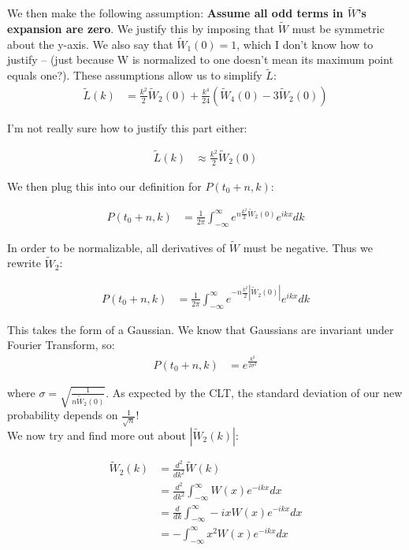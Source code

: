 \documentclass[10pt]{article} %
\begin{document}
We then make the following assumption: \textbf{Assume all odd terms in $\widetilde{W}$'s expansion are zero}. We justify this by imposing that
$\widetilde{W}$ must be symmetric about the y-axis. We also say that $\widetilde{W}_1(0)=1$, which I don't know how to justify -- (just because
W is normalized to one doesn't mean its maximum point equals one?). These assumptions allow us to simplify $\widetilde{L}$:\\

\begin{align*}
  \widetilde{L}(k) &= \frac{k^2}{2}\widetilde{W}_2(0) + \frac{k^4}{24}\left(\widetilde{W}_4(0) - 3\widetilde{W}_2(0)\right)
\end{align*}

I'm not really sure how to justify this part either:

\begin{align}
  \widetilde{L}(k) &\approx \frac{k^2}{2}\widetilde{W}_2(0)
\end{align}

We then plug this into our definition for $P(t_0+n,k)$:

\begin{align}
  P(t_0+n,k) &= \frac{1}{2\pi}\int_{-\infty}^{\infty}e^{n\frac{k^2}{2}\widetilde{W}_2(0)}e^{ikx}dk
\end{align}

In order to be normalizable, all derivatives of $\widetilde{W}$ must be negative. Thus we rewrite
$\widetilde{W}_2$:

\begin{align}
  P(t_0+n,k) &= \frac{1}{2\pi}\int_{-\infty}^{\infty}e^{-n\frac{k^2}{2}|\widetilde{W}_2(0)|}e^{ikx}dk
\end{align}

This takes the form of a Gaussian. We know that Gaussians are invariant under Fourier Transform,
so:\\

\begin{align}
  P(t_0+n,k) &= e^{\frac{k^2}{2\sigma^2}}
\end{align}

where $\sigma = \sqrt{\frac{1}{n\widetilde{W}_2(0)}}$. As expected by the CLT, the standard deviation of our
new probability depends on $\frac{1}{\sqrt{n}}$!\\

We now try and find more out about $|\widetilde{W}_2(k)|$:

\begin{align*}
  \widetilde{W}_2(k) &= \frac{d^2}{dk^2}\widetilde{W}(k)\\
  &= \frac{d^2}{dk^2}\int_{-\infty}^\infty W(x)e^{-ikx}dx\\
  &= \frac{d}{dk}\int_{-\infty}^\infty -ixW(x)e^{-ikx}dx\\
  &= -\int_{-\infty}^\infty x^2W(x)e^{-ikx}dx\\
\end{align*}
\end{document}
